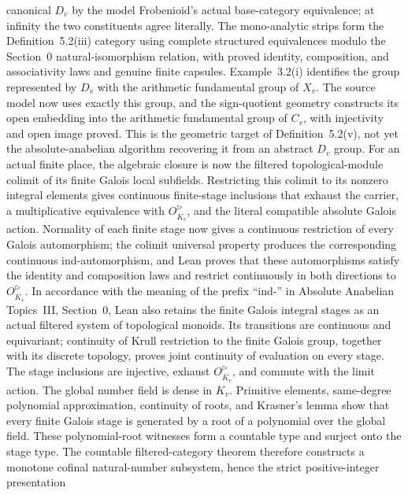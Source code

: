 \begin{definition}
  canonical \(D_v\) by the model Frobenioid's actual base-category
  equivalence; at infinity the two constituents agree literally.  The
  mono-analytic strips form the Definition~5.2(iii) category using complete
  structured equivalences modulo the Section~0 natural-isomorphism relation,
  with proved identity, composition, and associativity laws and genuine
  finite capsules.
  Example~3.2(i) identifies the group represented by \(D_v\) with the
  arithmetic fundamental group of \(X_v\).  The source model now uses exactly
  this group, and the sign-quotient geometry constructs its open embedding
  into the arithmetic fundamental group of \(C_v\), with injectivity and open
  image proved.  This is the geometric target of Definition~5.2(v), not yet
  the absolute-anabelian algorithm recovering it from an abstract \(D_v\)
  group.
  For an actual finite place, the algebraic closure is now the filtered
  topological-module colimit of its finite Galois local subfields.  Restricting
  this colimit to its nonzero integral elements gives continuous finite-stage
  inclusions that exhaust the carrier, a multiplicative equivalence with
  \(O_{\overline{K_v}}^\triangleright\), and the literal compatible absolute
  Galois action.  Normality of each finite stage now gives a continuous
  restriction of every Galois automorphism; the colimit universal property
  produces the corresponding continuous ind-automorphism, and Lean proves
  that these automorphisms satisfy the identity and composition laws and
  restrict continuously in both directions to
  \(O_{\overline{K_v}}^\triangleright\).  In accordance with the meaning of
  the prefix ``ind-'' in Absolute Anabelian Topics~III, Section~0, Lean also
  retains the finite Galois integral stages as an actual filtered system of
  topological monoids.  Its transitions are continuous and equivariant;
  continuity of Krull restriction to the finite Galois group, together with
  its discrete topology, proves joint continuity of evaluation on every
  stage.  The stage inclusions are injective, exhaust
  \(O_{\overline{K_v}}^\triangleright\), and commute with the limit action.
  The global number field is dense in \(K_v\).  Primitive elements,
  same-degree polynomial approximation, continuity of roots, and Krasner's
  lemma show that every finite Galois stage is generated by a root of a
  polynomial over the global field.  These polynomial-root witnesses form a
  countable type and surject onto the stage type.  The countable
  filtered-category theorem therefore constructs a monotone cofinal
  natural-number subsystem, hence the strict positive-integer presentation

\end{definition}
